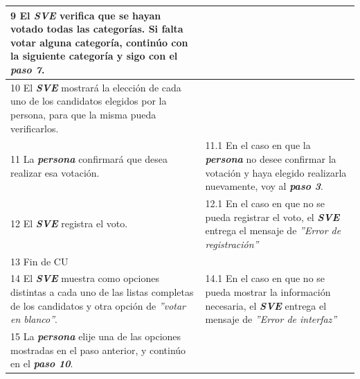 \documentclass[spanish, 10pt,a4paper]{article}
\numberwithin{equation}{section} %
\begin{document}
\begin{table}[H]
\begin{tabular}{p{9cm} | p{7cm}}
    \hline
    9 El \textbf{\textit{SVE}} verifica que se hayan votado todas las categorías. Si falta votar alguna categoría, continúo con la siguiente categoría y sigo con el \textbf{\textit{paso 7}}.
    & \\
    
    \hline
    10 El \textbf{\textit{SVE}} mostrará la elección de cada uno de los candidatos elegidos por la persona, para que la misma pueda verificarlos.
    & \\
    
    \hline
    11 La \textbf{\textit{persona}} confirmará que desea realizar esa votación.
    & 
    11.1 En el caso en que la \textbf{\textit{persona}} no desee confirmar la votación y haya elegido realizarla nuevamente, voy al \textbf{\textit{paso 3}}.\\
    
    \hline
    12 El \textbf{\textit{SVE}} registra el voto.
    & 
    12.1 En el caso en que no se pueda registrar el voto, el \textbf{\textit{SVE}} entrega el mensaje de \textit{''Error de registración''}
    \\
    
    \hline
    13 Fin de CU
    & \\
    
    \hline
    14 El \textbf{\textit{SVE}} muestra como opciones distintas a cada uno de las listas completas de los candidatos y otra opción de \textit{''votar en blanco''}.
    & 
    14.1 En el caso en que no se pueda mostrar la información necesaria, el \textbf{\textit{SVE}} entrega el mensaje de \textit{''Error de interfaz''}
    \\
    
    \hline
    15 La \textbf{\textit{persona}} elije una de las opciones mostradas en el paso anterior, y continúo en el \textbf{\textit{paso 10}}.
    & \\
    \hline
  \end{tabular}
\egroup
\end{table}
\end{document}
